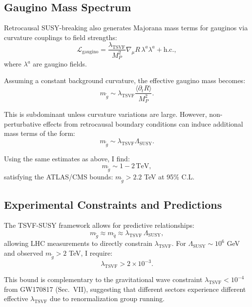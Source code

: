 \documentclass[twocolumn,superscriptaddress,floatfix]{revtex4-2}
\begin{document}
\subsection{Gaugino Mass Spectrum}

Retrocausal SUSY-breaking also generates Majorana mass terms for gauginos via curvature couplings to field strengths:
\begin{equation}
\mathcal{L}_{\text{gaugino}} = \frac{\lambda_{\text{TSVF}}}{M_P^2} \nabla_\mu R \, \lambda^a \lambda^a + \text{h.c.},
\end{equation}
where $\lambda^a$ are gaugino fields.

Assuming a constant background curvature, the effective gaugino mass becomes:
\begin{equation}
m_{\tilde{g}} \sim \lambda_{\text{TSVF}} \frac{\langle \partial_t R \rangle}{M_P^2}.
\end{equation}

This is subdominant unless curvature variations are large. However, non-perturbative effects from retrocausal boundary conditions can induce additional mass terms of the form:
\begin{equation}
m_{\tilde{g}} \sim \lambda_{\text{TSVF}} \Lambda_{\text{SUSY}}.
\end{equation}

Using the same estimates as above, I find:
\begin{equation}
m_{\tilde{g}} \sim 1 - 2 \, \text{TeV},
\end{equation}
satisfying the ATLAS/CMS bounds: $m_{\tilde{g}} > 2.2$ TeV at 95\% C.L.

\subsection{Experimental Constraints and Predictions}

The TSVF-SUSY framework allows for predictive relationships:
\begin{equation}
m_{\tilde{g}} \approx m_{\tilde{q}} \approx \lambda_{\text{TSVF}} \, \Lambda_{\text{SUSY}},
\end{equation}
allowing LHC measurements to directly constrain $\lambda_{\text{TSVF}}$. For $\Lambda_{\text{SUSY}} \sim 10^6$ GeV and observed $m_{\tilde{g}} > 2$ TeV, I require:
\begin{equation}
\lambda_{\text{TSVF}} > 2 \times 10^{-3}.
\end{equation}

This bound is complementary to the gravitational wave constraint $\lambda_{\text{TSVF}} < 10^{-4}$ from GW170817 (Sec.~VII), suggesting that different sectors experience different effective $\lambda_{\text{TSVF}}$ due to renormalization group running.
\end{document}
